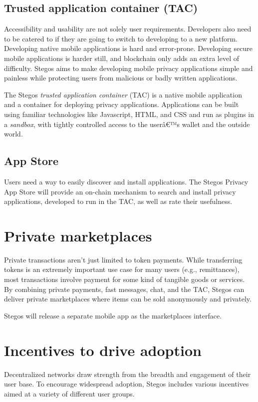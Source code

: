 \documentclass[8pt,fleqn,openany]{book}
\begin{document}
	\subsection{Trusted application container (TAC)}
	Accessibility and usability are not solely user requirements. Developers also need to be catered to if they are going to switch to developing to a new platform. Developing native mobile applications is hard and error-prone. Developing secure mobile applications is harder still, and blockchain only adds an extra level of difficulty. Stegos aims to make developing mobile privacy applications simple and painless while protecting users from malicious or badly written applications. 
	
	The Stegos \textit{trusted application container} (TAC) is a native mobile application and a container for deploying privacy applications. Applications can be built using familiar technologies like Javascript, HTML, and CSS and run as plugins in a \textit{sandbox}, with tightly controlled access to the userâ€™s wallet and the outside world.
	
	\subsection{App Store}
	Users need a way to easily discover and install applications. The Stegos Privacy App Store will provide an on-chain mechanism to search and install privacy applications, developed to run in the TAC, as well as rate their usefulness.  
	
	\section{Private marketplaces}
	Private transactions aren't just limited to token payments. While transferring tokens is an extremely important use case for many users (e.g., remittances), most transactions involve payment for some kind of tangible goods or services. By combining private payments, fast messages, chat, and the TAC, Stegos can deliver private marketplaces where items can be sold anonymously and privately. 
	
	Stegos will release a separate mobile app as the marketplaces interface.  
	
	\section{Incentives to drive adoption}
	Decentralized networks draw strength from the breadth and engagement of their user base. To encourage widespread adoption, Stegos includes various incentives aimed at a variety of different user groups. 
	
\end{document}
